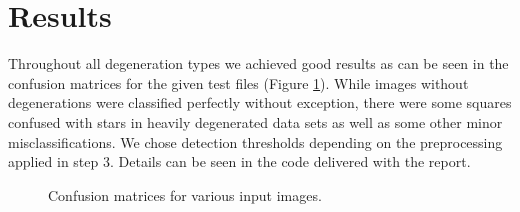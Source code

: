 \documentclass[conference]{IEEEtran}
\begin{document}
\section{Results}
\label{sec:results}

Throughout all degeneration types we achieved good results as can be seen in the confusion matrices
for the given test files (Figure \ref{fig:confusion_matrices}). 
While images without degenerations were classified perfectly without exception, 
there were some squares confused with stars in heavily degenerated data sets as well as some other minor misclassifications. 
We chose detection thresholds depending on the preprocessing applied in step 3.
Details can be seen in the code delivered with the report.
 
\begin{figure}[ht!]%
\centering
{}
\caption{Confusion matrices for various input images.}
\label{fig:confusion_matrices}
\end{figure}
\end{document}
